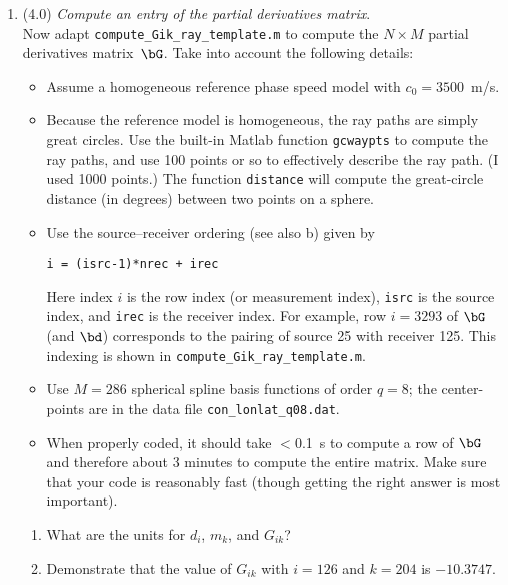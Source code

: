 \documentclass[11pt,titlepage,fleqn]{article}
\begin{document}
\begin{enumerate}

\item (4.0) {\em Compute an entry of the partial derivatives matrix}. \\
Now adapt \verb+compute_Gik_ray_template.m+ to compute the $N \times M$ partial derivatives matrix~$\bG$.
Take into account the following details:
%
\begin{itemize}
\item Assume a homogeneous reference phase speed model with $c_0 = 3500$~m/s.

\item Because the reference model is homogeneous, the ray paths are simply great circles.  Use the built-in Matlab function \verb+gcwaypts+ to compute the ray paths, and use 100 points or so to effectively describe the ray path. (I used 1000 points.) The function \verb+distance+ will compute the great-circle distance (in degrees) between two points on a sphere.

\item Use the source--receiver ordering (see also b) given by

\begin{verbatim}
i = (isrc-1)*nrec + irec
\end{verbatim}

Here index $i$ is the row index (or measurement index), \verb+isrc+ is the source index, and \verb+irec+ is the receiver index.
For example, row $i=3293$ of $\bG$ (and $\bd$) corresponds to the pairing of source 25 with receiver 125.
This indexing is shown in \verb+compute_Gik_ray_template.m+.

\item Use $M=286$ spherical spline basis functions of order $q=8$; the center-points are in the data file \verb+con_lonlat_q08.dat+.

\item When properly coded, it should take $<$0.1~s to compute a row of $\bG$ and therefore about 3 minutes to compute the entire matrix. Make sure that your code is reasonably fast (though getting the right answer is most important).

\end{itemize}

\begin{enumerate}
\item What are the units for $d_i$, $m_k$, and $G_{ik}$?

\item Demonstrate that the value of $G_{ik}$ with $i=126$ and $k=204$ is $-10.3747$.


\end{enumerate}
\end{enumerate}
\end{document}
